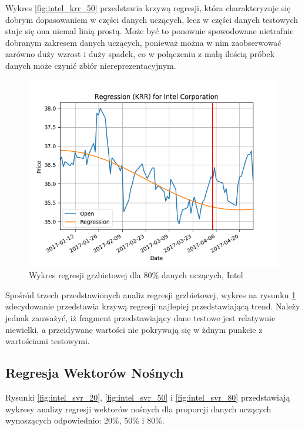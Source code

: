 Wykres \ref{fig:intel_krr_50} przedstawia krzywą regresji, która charakteryzuje się dobrym dopasowaniem w części danych uczących, lecz w części danych testowych staje się ona niemal linią prostą.
Może być to ponownie spowodowane nietrafnie dobranym zakresem danych uczących, ponieważ można w nim zaobserwować zarówno duży wzrost i duży spadek, co w połączeniu z małą ilością próbek danych może czynić zbiór niereprezentacyjnym.\\

\begin{figure}[h!]
\centering
\includegraphics[width=150mm]{pictures/plots/intel_krr_80.png}
\caption{Wykres regresji grzbietowej dla 80\% danych uczących, Intel}
\label{fig:intel_krr_80}
\end{figure}

Spośród trzech przedstawionych analiz regresji grzbietowej, wykres na rysunku \ref{fig:intel_krr_80} zdecydowanie przedstawia krzywą regresji najlepiej przedstawiającą trend.
Należy jednak zauważyć, iż fragment przedstawiający dane testowe jest relatywnie niewielki, a przeidywane wartości nie pokrywają się w żdnym punkcie z wartościami testowymi.\\

\subsection{Regresja Wektorów Nośnych}

Rysunki \ref{fig:intel_svr_20}, \ref{fig:intel_svr_50} i \ref{fig:intel_svr_80} przedstawiają wykresy analizy regresji wektorów nośnych dla proporcji danych uczących wynoszących odpowiednio: 20\%, 50\% i 80\%.\\


